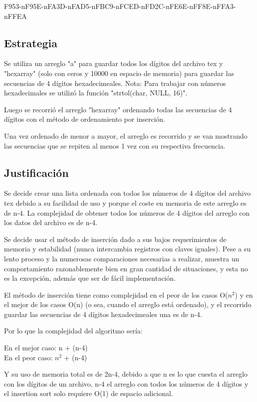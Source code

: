 \documentclass[10pt,letterpaper]{article}
\begin{document}
F953-nF95E-nFA3D-nFAD5-nFBC9-nFCED-nFD2C-nFE6E-nFF8E-nFFA3-nFFEA

\subsection{Estrategia}

Se utiliza un arreglo "a" para guardar todos los dígitos del archivo tex y "hexarray" (solo con ceros y 10000 en espacio de memoria) para guardar las secuencias de 4 dígitos hexadecimeales.
Nota: Para trabajar con números hexadecimales se utilizó la función "strtol(char, NULL, 16)". 

Luego se recorrió el arreglo "hexarray" ordenando todas las secuencias de 4 dígitos con el método de ordenamiento por inserción.

Una vez ordenado de menor a mayor, el arreglo es recorrido y se van mostrando las secuencias que se repiten al menos 1 vez con su respectiva frecuencia.

\subsection{Justificación}

Se decide crear una lista ordenada con todos los números de 4 dígitos del archivo tex debido a su facilidad de uso y porque el coste en memoria de este arreglo es de n-4. La complejidad de obtener todos los números de 4 dígitos del arreglo con los datos del archivo es de n-4.

Se decide usar el método de inserción dado a sus bajos requerimientos de memoria y estabilidad (nunca intercambia registros con claves iguales). Pese a su lento proceso y la numerosas comparaciones necesarias a realizar, muestra un comportamiento razonablemente bien en gran cantidad de situaciones, y esta no es la excepción, además que ser de fácil implementación.

El método de inserción tiene como complejidad en el peor de los casos O($n^2$) y en el mejor de los casos O(n) (o sea, cuando el arreglo está ordenado), y el recorrido guardar las secuencias de 4 dígitos hexadecimeales una es de n-4.

Por lo que la complejidad del algoritmo sería: 

En el mejor caso: n + (n-4)
\\
En el peor caso: $n^2$ + (n-4)


Y su uso de memoria total es de 2n-4, debido a que n es lo que cuesta el arreglo con los dígitos de un archivo, n-4 el arreglo con todos los números de 4 dígitos y el insertion sort solo requiere O(1) de espacio adicional.
\end{document}
